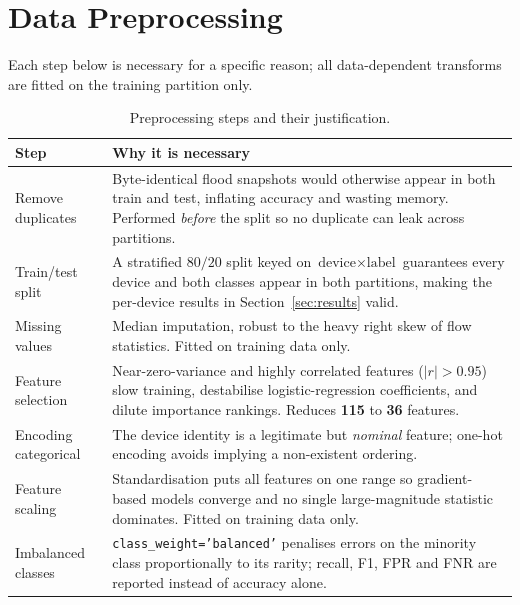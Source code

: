 \documentclass[11pt]{article}
\begin{document}
\section{Data Preprocessing}
Each step below is necessary for a specific reason; all data-dependent
transforms are fitted on the training partition only.

\begin{table}[h]
\centering
\caption{Preprocessing steps and their justification.}
\label{tab:preprocessing}
\begin{tabular}{@{} p{} p{} @{}}
\toprule
\textbf{Step} & \textbf{Why it is necessary} \\
\midrule
Remove duplicates & Byte-identical flood snapshots would otherwise appear in
both train and test, inflating accuracy and wasting memory. Performed
\emph{before} the split so no duplicate can leak across partitions. \\
\addlinespace
Train/test split & A stratified $80/20$ split keyed on
$\text{device} \times \text{label}$ guarantees every device and both classes
appear in both partitions, making the per-device results in
Section~\ref{sec:results} valid. \\
\addlinespace
Missing values & Median imputation, robust to the heavy right skew of flow
statistics. Fitted on training data only. \\
\addlinespace
Feature selection & Near-zero-variance and highly correlated features
($|r| > 0.95$) slow training, destabilise logistic-regression coefficients,
and dilute importance rankings. Reduces \textbf{115} to \textbf{36}
features. \\
\addlinespace
Encoding categorical & The device identity is a legitimate but \emph{nominal}
feature; one-hot encoding avoids implying a non-existent ordering. \\
\addlinespace
Feature scaling & Standardisation puts all features on one range so
gradient-based models converge and no single large-magnitude statistic
dominates. Fitted on training data only. \\
\addlinespace
Imbalanced classes & \texttt{class\_weight='balanced'} penalises errors on the
minority class proportionally to its rarity; recall, F1, FPR and FNR are
reported instead of accuracy alone. \\
\bottomrule
\end{tabular}
\end{table}
\end{document}
